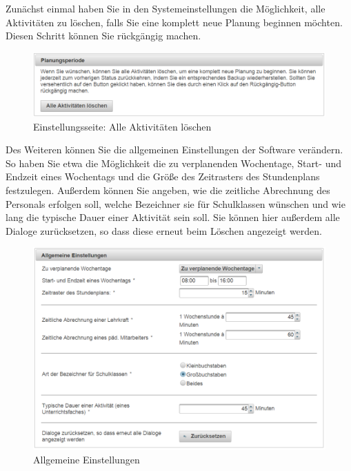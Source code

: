 \documentclass[fontsize=12pt]{scrartcl}
\begin{document}
Zunächst einmal haben Sie in den Systemeinstellungen die Möglichkeit, alle Aktivitäten zu löschen, falls Sie eine komplett neue Planung beginnen möchten. Diesen Schritt können Sie rückgängig machen. 

\begin{figure}[H]
\includegraphics[width=\textwidth]{images/systemSettings1.png}
\caption{Einstellungsseite: Alle Aktivitäten löschen}
\end{figure}

Des Weiteren können Sie die allgemeinen Einstellungen der Software verändern. So haben Sie etwa die Möglichkeit die zu verplanenden Wochentage, Start- und Endzeit eines Wochentags und die Größe des Zeitrasters des Stundenplans festzulegen. Außerdem können Sie angeben, wie die zeitliche Abrechnung des Personals erfolgen soll, welche Bezeichner sie für Schulklassen wünschen und wie lang die typische Dauer einer Aktivität sein soll. Sie können hier außerdem alle Dialoge zurücksetzen, so dass diese erneut beim Löschen angezeigt werden. \\


\begin{figure}[H]
\includegraphics[width=\textwidth]{images/systemSettings2.png}
\caption{Allgemeine Einstellungen}
\end{figure}
\end{document}
